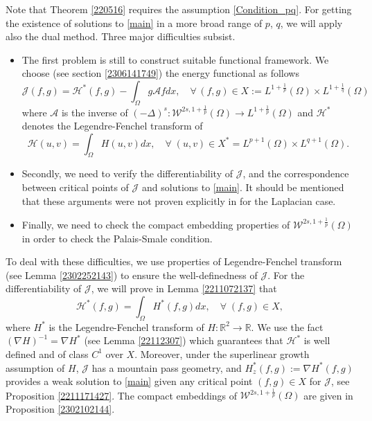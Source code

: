 \documentclass[10pt]{article}
\numberwithin{equation}{section}
\numberwithin{equation}{section}
\begin{document}
Note that Theorem \ref{220516} requires the assumption \eqref{Condition_pq}. For getting the existence of solutions to \eqref{main} in a more broad range of $p$, $q$, we will apply also the dual method. Three major difficulties subsist.
\begin{itemize}
\item The first problem is still to construct suitable functional framework. We choose (see section \ref{2306141749}) the energy functional as follows
\begin{equation}\label{2211011351}
\mathcal{J}(f, g)=\mathcal{H}^*(f, g)-\int_{\Omega}g\mathcal{A}f dx,\quad \forall \, (f, g)\in X:=L^{1+\frac1p}(\Omega)\times L^{1+\frac1q}(\Omega)
\end{equation}
where $\mathcal{A}$ is the inverse of $(-\Delta)^s: \mathcal{W}^{2s, 1+\frac1p}(\Omega)\to L^{1+\frac1p}(\Omega)$ and $\mathcal{H}^*$ denotes the Legendre-Fenchel transform of 
\[
\mathcal{H}(u, v)=\int_{\Omega}H(u, v) dx, \quad \forall\; (u, v)\in X^*=L^{p+1}(\Omega)\times L^{q+1}(\Omega).
\]
\item Secondly, we need to verify the differentiability of $\mathcal{J}$, and the correspondence between critical points of $\mathcal{J}$ and solutions to \eqref{main}. It should be mentioned that these arguments were not proven explicitly in \cite{CV1995} for the Laplacian case.
    \item Finally, we need to check the compact embedding properties of $\mathcal{W}^{2s, 1+\frac1p}(\Omega)$ in order to check the Palais-Smale condition.
\end{itemize}

To deal with these difficulties, we use properties of Legendre-Fenchel transform (see Lemma \ref{2302252143}) to ensure the well-definedness of $\mathcal{J}$. For  the differentiability of $\mathcal{J}$, we will prove in Lemma \ref{2211072137} that
\[
\mathcal{H}^*(f, g)=\int_{\Omega}H^*(f, g) dx,\quad \forall\; (f, g)\in X,
\]
where $H^*$ is the Legendre-Fenchel transform of $H: \mathbb{R}^2\to \mathbb{R}$.  We use the fact
$(\nabla H)^{-1}=\nabla H^*$ (see Lemma \ref{22112307}) which guarantees that $\mathcal{H}^*$ is well defined and of class $C^1$ over $X$. Moreover, under the superlinear growth assumption of $H$, $\mathcal{J}$ has a mountain pass geometry, and $H_z^*(f, g) := \nabla H^*(f, g)$ provides a weak solution to \eqref{main} given any critical point $(f, g)\in X$ for $\mathcal{J}$, see Proposition \ref{2211171427}. The compact embeddings of $\mathcal{W}^{2s, 1+\frac1p}(\Omega)$ are given in Proposition \ref{2302102144}.
\end{document}
